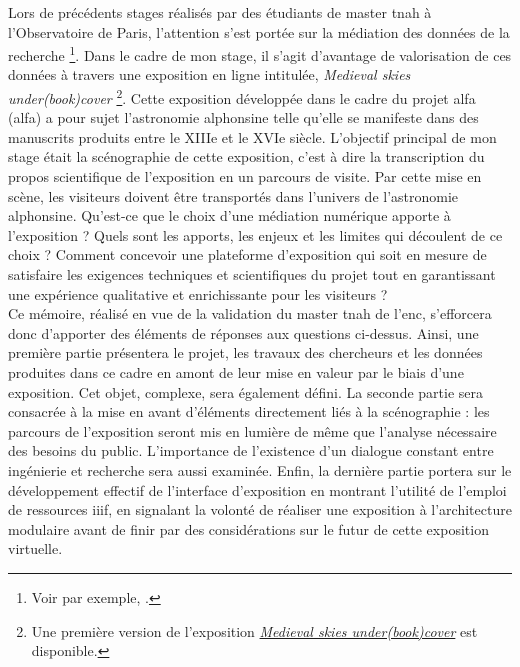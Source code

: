 Lors de précédents stages réalisés par des étudiants de master \acrshort{tnah} à l'Observatoire de Paris, l'attention s'est portée sur la médiation des données de la recherche \footnote{Voir par exemple, \cite{albouyMediationDonneesRecherche2019}.}. Dans le cadre de mon stage, il s'agit d'avantage de valorisation de ces données à travers une exposition en ligne intitulée, \textit{Medieval skies under(book)cover} \footnote{Une première version de l'exposition \href{https://alfa-exhibition.herokuapp.com}{\textit{Medieval skies under(book)cover}} est disponible.}. Cette exposition développée dans le cadre du projet \acrshort{alfa} (\acrlong{alfa}) a pour sujet l'astronomie alphonsine telle qu'elle se manifeste dans des manuscrits produits entre le XIIIe et le XVIe siècle. L'objectif principal de mon stage était la scénographie de cette exposition, c'est à dire la transcription du propos scientifique de l’exposition en un parcours de visite. Par cette mise en scène, les visiteurs doivent être transportés dans l'univers de l'astronomie alphonsine. Qu'est-ce que le choix d'une médiation numérique apporte à l'exposition ? Quels sont les apports, les enjeux et les limites qui découlent de ce choix ? Comment concevoir une plateforme d'exposition qui soit en mesure de satisfaire les exigences techniques et scientifiques du projet tout en garantissant une expérience  qualitative et enrichissante pour les visiteurs ? \\

Ce mémoire, réalisé en vue de la validation du master \acrshort{tnah} de l'\acrlong{enc}, s'efforcera donc d'apporter des éléments de réponses aux questions ci-dessus. Ainsi, une première partie présentera le projet, les travaux des chercheurs et les données produites dans ce cadre en amont de leur mise en valeur par le biais d'une exposition. Cet objet, complexe, sera également défini. La seconde partie sera consacrée à la mise en avant d'éléments directement liés à la scénographie : les parcours de l'exposition seront mis en lumière de même que l'analyse nécessaire des besoins du public. L'importance de l'existence d'un dialogue constant entre ingénierie et recherche sera aussi examinée. Enfin, la dernière partie portera sur le développement effectif de l'interface d'exposition en montrant l'utilité de l'emploi de ressources \acrshort{iiif}, en signalant la volonté de réaliser une exposition à l'architecture modulaire avant de finir par des considérations sur le futur de cette exposition virtuelle.
